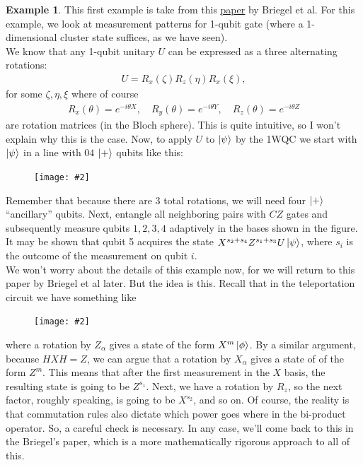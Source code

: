 \documentclass{book}
\theoremstyle{definition}
\newtheorem{exmp}{Example}[section]
\newcommand{\al}{\alpha}
\newcommand{\fig}[2]{
	\begin{figure}[!htb]
		\centering
		\texttt{[image: \#2]}
	\end{figure}}
\begin{document}
\begin{exmp}
	This first example is take from this \href{https://arxiv.org/pdf/quant-ph/0301052.pdf}{\underline{paper}} by Briegel et al. For this example, we look at measurement patterns for 1-qubit gate (where a 1-dimensional cluster state suffices, as we have seen). \\
	
	We know that any 1-qubit unitary $U$ can be expressed as a three alternating rotations:
	\begin{align}
	U = R_x (\zeta)R_z(\eta)R_x(\xi),
	\end{align}
	for some $\zeta, \eta, \xi$ where of course 
	\begin{align}
	R_x(\theta) = e^{-i\theta X}, \quad R_y(\theta) = e^{-i\theta Y}, \quad R_z(\theta) = e^{-i\theta Z}
	\end{align}
	are rotation matrices (in the Bloch sphere). This is quite intuitive, so I won't explain why this is the case. Now, to apply $U$ to $\ket{\psi}$ by the 1WQC we start with $\ket{\psi}$ in a line with $04$ $\ket{+}$ qubits like this:
	
	\fig{0.3}{rotate}
	
	Remember that because there are 3 total rotations, we will need four $\ket{+}$ ``ancillary'' qubits. Next, entangle all neighboring pairs with $CZ$ gates and subsequently measure qubits $1,2,3,4$ adaptively in the bases shown in the figure. It may be shown that qubit 5 acquires the state $X^{s_2 + s_4} Z^{s_1 + s_3} U\ket{\psi}$, where $s_i$ is the outcome of the measurement on qubit $i$. \\
	
	We won't worry about the details of this example now, for we will return to this paper by Briegel et al later. But the idea is this. Recall that in the teleportation circuit we have something like
	
	\fig{0.3}{tele}
	
	where a rotation by $Z_\al$ gives a state of the form $X^m \ket{\phi}$. By a similar argument, because $HXH = Z$, we can argue that a rotation by $X_\al$ gives a state of of the form $Z^m$. This means that after the first measurement in the $X$ basis, the resulting state is going to be $Z^{s_1}$. Next, we have a rotation by $R_z$, so the next factor, roughly speaking, is going to be $X^{s_2}$, and so on. Of course, the reality is that commutation rules also dictate which power goes where in the bi-product operator. So, a careful check is necessary. In any case, we'll come back to this in the Briegel's paper, which is a more mathematically rigorous approach to all of this. 
\end{exmp}
\end{document}
